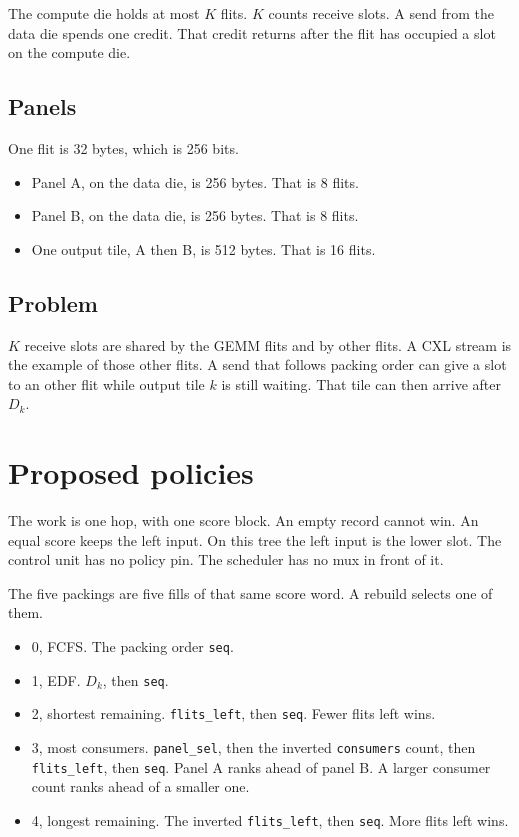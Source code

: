 \documentclass[11pt,a4paper]{article}
\begin{document}
The compute die holds at most $K$ flits.
$K$ counts receive slots.
A send from the data die spends one credit.
That credit returns after the flit has occupied a slot on the compute die.

\subsection{Panels}
One flit is 32 bytes, which is 256 bits.
\begin{itemize}[leftmargin=*]
  \item Panel A, on the data die, is 256 bytes. That is 8 flits.
  \item Panel B, on the data die, is 256 bytes. That is 8 flits.
  \item One output tile, A then B, is 512 bytes. That is 16 flits.
\end{itemize}

\subsection{Problem}
$K$ receive slots are shared by the GEMM flits and by other flits.
A CXL stream is the example of those other flits.
A send that follows packing order can give a slot to an other flit while output tile $k$ is still waiting.
That tile can then arrive after $D_k$.

\section{Proposed policies}
The work is one hop, with one score block.
An empty record cannot win.
An equal score keeps the left input.
On this tree the left input is the lower slot.
The control unit has no policy pin.
The scheduler has no mux in front of it.

The five packings are five fills of that same score word.
A rebuild selects one of them.
\begin{itemize}[leftmargin=*]
  \item 0, FCFS. The packing order \texttt{seq}.
  \item 1, EDF. $D_k$, then \texttt{seq}.
  \item 2, shortest remaining. \texttt{flits\_left}, then \texttt{seq}. Fewer flits left wins.
  \item 3, most consumers. \texttt{panel\_sel}, then the inverted \texttt{consumers} count, then \texttt{flits\_left}, then \texttt{seq}. Panel A ranks ahead of panel B. A larger consumer count ranks ahead of a smaller one.
  \item 4, longest remaining. The inverted \texttt{flits\_left}, then \texttt{seq}. More flits left wins.
\end{itemize}
\end{document}
